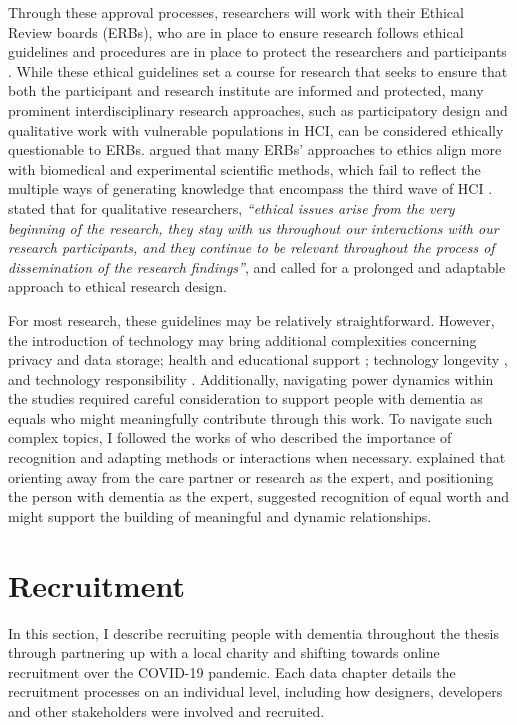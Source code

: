 Through these approval processes, researchers will work with their Ethical Review boards (ERBs), who are in place to ensure research follows ethical guidelines and procedures are in place to protect the researchers and participants \citep{pachana_can_2014}. While these ethical guidelines set a course for research that seeks to ensure that both the participant and research institute are informed and protected, many prominent interdisciplinary research approaches, such as participatory design and qualitative work with vulnerable populations in HCI, can be considered ethically questionable to ERBs. \cite{bell_censorship_2014} argued that many ERBs’ approaches to ethics align more with biomedical and experimental scientific methods, which fail to reflect the multiple ways of generating knowledge that encompass the third wave of HCI \citep{bodker_when_2006,lazar_critical_2017}. \cite{carla_introducing_2013} stated that for qualitative researchers,\textit{ ``ethical issues arise from the very beginning of the research, they stay with us throughout our interactions with our research participants, and they continue to be relevant throughout the process of dissemination of the research findings''}, and called for a prolonged and adaptable approach to ethical research design. 

For most research, these guidelines may be relatively straightforward. However, the introduction of technology may bring additional complexities concerning privacy and data storage; health and educational support \citep{gray2016inscribing}; technology longevity \citep{foley_printer_2019}, and technology responsibility \citep{ferrario_software_2014}. Additionally, navigating power dynamics within the studies required careful consideration to support people with dementia as equals who might meaningfully contribute through this work. To navigate such complex topics, I followed the works of \cite{nolan_beyond_2004,bartlett_personhood_2007,keady_involving_2007} who described the importance of recognition and adapting methods or interactions when necessary. \cite{nolan2002towards} explained that orienting away from the care partner or research as the expert, and positioning the person with dementia as the expert, suggested recognition of equal worth and might support the building of meaningful and dynamic relationships. 


\section{Recruitment}
\label{Method:Recruitment}
In this section, I describe recruiting people with dementia throughout the thesis through partnering up with a local charity and shifting towards online recruitment over the COVID-19 pandemic. Each data chapter details the recruitment processes on an individual level, including how designers, developers and other stakeholders were involved and recruited.

